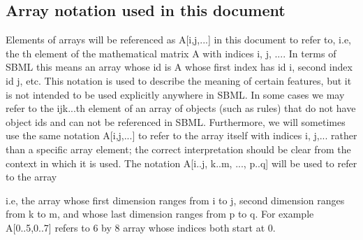\subsection{Array notation used in this document}

Elements of arrays will be referenced as A[i,j,...] in this document to refer to, i.e,  the  th element of the mathematical matrix A with indices i, j, .... 
In terms of SBML this means an array whose id is A whose first index has id i, second index id j, etc. This notation is used to describe the meaning of certain features, but it is not intended to be used explicitly anywhere in SBML. 
In some cases we may refer to the ijk...th element of an array of objects (such as rules) that do not have object ids and can not be referenced in SBML. 
Furthermore, we will sometimes use the same notation A[i,j,...] to refer to the array itself with indices i, j,... rather than a specific array element; the correct interpretation should be clear from the context in which it is used. 
The notation A[i..j, k..m, ..., p..q] will be used to refer to the array 
	 
i.e, the array whose first dimension ranges from i to j, second dimension ranges from k to m, and whose last dimension ranges from p to q. For example A[0..5,0..7] refers to 6 by 8 array whose indices both start at 0. 



